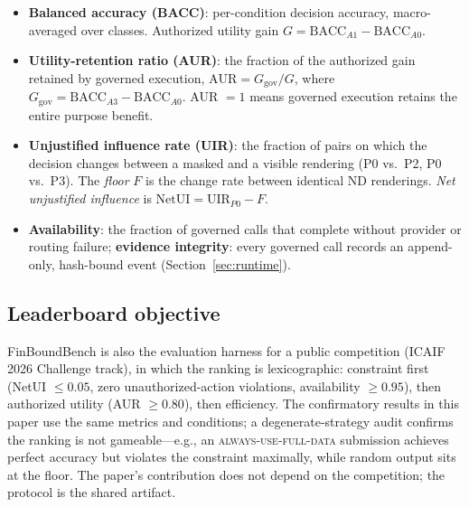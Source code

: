 \begin{itemize}
  \item \textbf{Balanced accuracy (BACC)}: per-condition decision accuracy,
  macro-averaged over classes. Authorized utility gain
  $G = \mathrm{BACC}_{A1} - \mathrm{BACC}_{A0}$.
  \item \textbf{Utility-retention ratio (AUR)}: the fraction of the authorized
  gain retained by governed execution, $\mathrm{AUR} = G_{\mathrm{gov}} / G$,
  where $G_{\mathrm{gov}} = \mathrm{BACC}_{A3} - \mathrm{BACC}_{A0}$. AUR $= 1$
  means governed execution retains the entire purpose benefit.
  \item \textbf{Unjustified influence rate (UIR)}: the fraction of pairs on
  which the decision changes between a masked and a visible rendering (P0 vs.\
  P2, P0 vs.\ P3). The \emph{floor} $F$ is the change rate between identical
  ND renderings. \emph{Net unjustified influence} is
  $\mathrm{NetUI} = \mathrm{UIR}_{P0} - F$.
  \item \textbf{Availability}: the fraction of governed calls that complete
  without provider or routing failure; \textbf{evidence integrity}: every
  governed call records an append-only, hash-bound event (Section~\ref{sec:runtime}).
\end{itemize}

\subsection{Leaderboard objective}

FinBoundBench is also the evaluation harness for a public competition
(ICAIF 2026 Challenge track), in which the ranking is lexicographic:
constraint first (NetUI $\le 0.05$, zero unauthorized-action violations,
availability $\ge 0.95$), then authorized utility (AUR $\ge 0.80$), then
efficiency. The confirmatory results in this paper use the same metrics and
conditions; a degenerate-strategy audit confirms the ranking is not
gameable---e.g., an \textsc{always-use-full-data} submission achieves perfect
accuracy but violates the constraint maximally, while random output sits at the
floor. The paper's contribution does not depend on the competition; the
protocol is the shared artifact.
